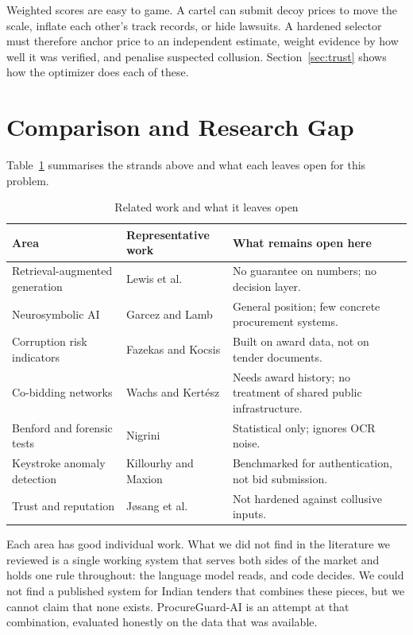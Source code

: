 Weighted scores are easy to game. A cartel can submit decoy prices to move the scale, inflate each other's track records, or hide lawsuits. A hardened selector must therefore anchor price to an independent estimate, weight evidence by how well it was verified, and penalise suspected collusion. Section~\ref{sec:trust} shows how the optimizer does each of these.

\section{Comparison and Research Gap}
Table~\ref{tab:related} summarises the strands above and what each leaves open for this problem.

\begin{table}[htbp]
\centering
\caption{Related work and what it leaves open}
\label{tab:related}
\small
\renewcommand{\arraystretch}{1.15}
\begin{tabularx}{\textwidth}{@{}>{\raggedright\arraybackslash}p{3.0cm}>{\raggedright\arraybackslash}p{3.7cm}>{\raggedright\arraybackslash}X@{}}
\toprule
\textbf{Area} & \textbf{Representative work} & \textbf{What remains open here} \\
\midrule
Retrieval-augmented generation & Lewis et al.\ \cite{lewis2020retrieval} & No guarantee on numbers; no decision layer. \\
Neurosymbolic AI & Garcez and Lamb \cite{garcez2023neurosymbolic} & General position; few concrete procurement systems. \\
Corruption risk indicators & Fazekas and Kocsis \cite{fazekas2020uncovering} & Built on award data, not on tender documents. \\
Co-bidding networks & Wachs and Kert\'esz \cite{wachs2019network} & Needs award history; no treatment of shared public infrastructure. \\
Benford and forensic tests & Nigrini \cite{nigrini2012benford} & Statistical only; ignores OCR noise. \\
Keystroke anomaly detection & Killourhy and Maxion \cite{killourhy2009comparing} & Benchmarked for authentication, not bid submission. \\
Trust and reputation & J{\o}sang et al.\ \cite{josang2007survey} & Not hardened against collusive inputs. \\
\bottomrule
\end{tabularx}
\end{table}

Each area has good individual work. What we did not find in the literature we reviewed is a single working system that serves both sides of the market and holds one rule throughout: the language model reads, and code decides. We could not find a published system for Indian tenders that combines these pieces, but we cannot claim that none exists. ProcureGuard-AI is an attempt at that combination, evaluated honestly on the data that was available.
